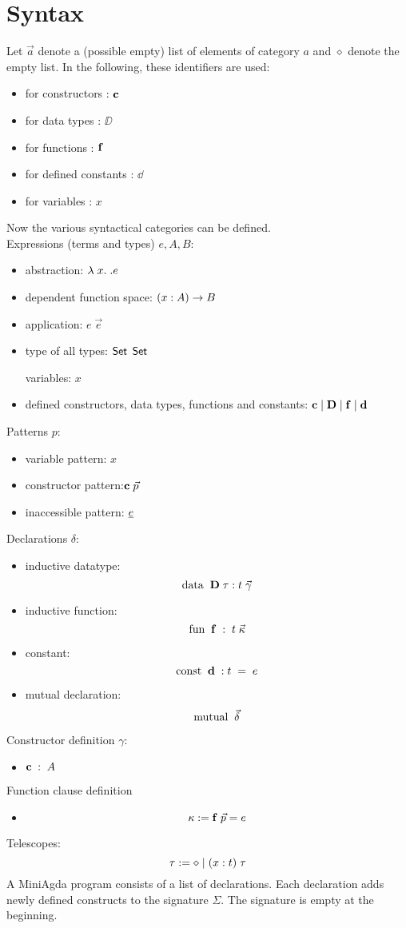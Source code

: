 \section{Syntax}
Let $\vec{a}$ denote a (possible empty) list of elements of category $a$
and $\diamond$ denote the empty list.
In the following, these identifiers are used:
\begin{itemize}
\item for constructors : $\mathbf{c}$ 
\item for data types : $\DD$
\item for functions : $\mathbf{f}$
\item for defined constants : $\dd$
\item for variables : $x$
\end{itemize}
Now the various syntactical categories can be defined.
\\
Expressions (terms and types) $e,A,B$:  
\begin{itemize}
\item
abstraction: $ \lambda\; x .\; . e $ 
\item
dependent function space: $( x : A ) \rightarrow{B}$ 
\item 
application: $ e \; \vec{e} $ 
\item
type of all types: $ \mathsf{Set} $  $ \mathsf{Set} $ 

variables: $x$
\item
defined constructors, data types, functions and constants:
$ \mathbf{c} \;\vert\; \mathbf{D} \;\vert\; \mathbf{f} \;\vert\; \mathbf{d}$
\end{itemize}
Patterns $p$:
\begin{itemize}
\item
variable pattern: $x$ 
\item
constructor pattern:$ \mathbf{c} \; \vec{p} $ 
\item
inaccessible pattern: $ \underline{e} $ 
\end{itemize}
Declarations $\delta$:
\begin{itemize}
\item
inductive datatype: 
\[\mathrm{data}\; \; \mathbf{D} \; \tau : t \; \vec{\gamma}\]  
\item
inductive function:
\[\mathrm{fun}\; \; \mathbf{f} \; : \; t \; \vec{\kappa}\]
\item
constant:
\[\mathrm{const}\; \;  \mathbf{d} \; : t \; = \; e \]
\item
mutual declaration:
\[\mathrm{mutual}\; \; \vec{\delta}\]
\end{itemize}
Constructor definition $\gamma$:
\begin{itemize}
\item
$ \mathbf{c} \; : \; A $ 
\end{itemize}
Function clause definition
\begin{itemize}
\item
\[ \kappa :=  \mathbf{f} \; \vec{p} = e \]
\end{itemize}
Telescopes:
\[ \tau := \diamond \;\vert\; ( x : t ) \; \tau \]
A MiniAgda program consists of a list of declarations.
Each declaration adds newly defined constructs to the signature $\Sigma$.
The signature is empty at the beginning.
